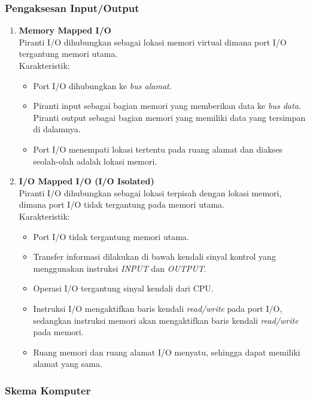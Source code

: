 \documentclass[12pt]{article}
\begin{document}
\setcounter{subsubsection}{3}
\subsubsection{Pengaksesan Input/Output}

\begin{enumerate}
    \item \textbf{Memory Mapped I/O} \\
    Piranti I/O dihubungkan sebagai lokasi memori virtual dimana port I/O tergantung memori utama. \\ 
    Karakteristik:
    \begin{itemize}
        \item Port I/O dihubungkan ke \textit{bus alamat}.
        \item Piranti input sebagai bagian memori yang memberikan data ke \textit{bus data}. Piranti output sebagai bagian memori yang memiliki data yang tersimpan di dalamnya.
        \item Port I/O menempati lokasi tertentu pada ruang alamat dan diakses seolah-olah adalah lokasi memori.
    \end{itemize}
    
    \item \textbf{I/O Mapped I/O (I/O Isolated)} \\
    Piranti I/O dihubungkan sebagai lokasi terpisah dengan lokasi memori, dimana port I/O tidak tergantung pada memori utama. \\
    Karakteristik:
    \begin{itemize}
        \item Port I/O tidak tergantung memori utama.
        \item Transfer informasi dilakukan di bawah kendali sinyal kontrol yang menggunakan instruksi \textit{INPUT} dan \textit{OUTPUT}.
        \item Operasi I/O tergantung sinyal kendali dari CPU.
        \item Instruksi I/O mengaktifkan baris kendali \textit{read/write} pada port I/O, sedangkan instruksi memori akan mengaktifkan baris kendali \textit{read/write} pada memori.
        \item Ruang memori dan ruang alamat I/O menyatu, sehingga dapat memiliki alamat yang sama.
    \end{itemize}
\end{enumerate}

\subsubsection{Skema Komputer}
\end{document}
